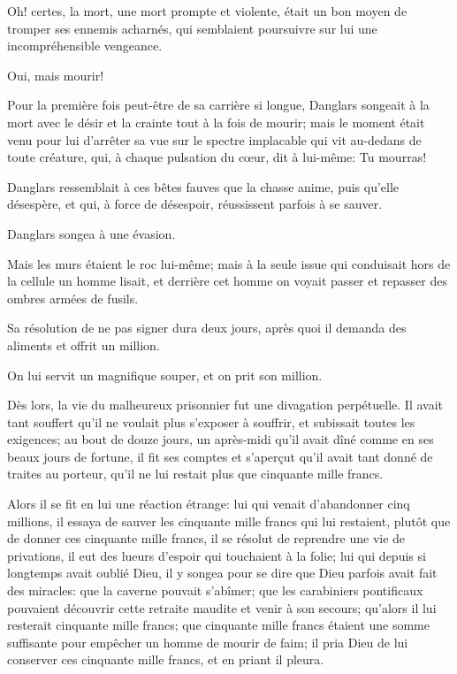 Oh! certes, la mort, une mort prompte et violente, était un bon moyen de tromper ses ennemis acharnés, qui semblaient poursuivre sur lui une incompréhensible vengeance. 

Oui, mais mourir! 

Pour la première fois peut-être de sa carrière si longue, Danglars songeait à la mort avec le désir et la crainte tout à la fois de mourir; mais le moment était venu pour lui d'arrêter sa vue sur le spectre implacable qui vit au-dedans de toute créature, qui, à chaque pulsation du cœur, dit à lui-même: Tu mourras! 

Danglars ressemblait à ces bêtes fauves que la chasse anime, puis qu'elle désespère, et qui, à force de désespoir, réussissent parfois à se sauver. 

Danglars songea à une évasion. 

Mais les murs étaient le roc lui-même; mais à la seule issue qui conduisait hors de la cellule un homme lisait, et derrière cet homme on voyait passer et repasser des ombres armées de fusils. 

Sa résolution de ne pas signer dura deux jours, après quoi il demanda des aliments et offrit un million. 

On lui servit un magnifique souper, et on prit son million. 

Dès lors, la vie du malheureux prisonnier fut une divagation perpétuelle. Il avait tant souffert qu'il ne voulait plus s'exposer à souffrir, et subissait toutes les exigences; au bout de douze jours, un après-midi qu'il avait dîné comme en ses beaux jours de fortune, il fit ses comptes et s'aperçut qu'il avait tant donné de traites au porteur, qu'il ne lui restait plus que cinquante mille francs. 

Alors il se fit en lui une réaction étrange: lui qui venait d'abandonner cinq millions, il essaya de sauver les cinquante mille francs qui lui restaient, plutôt que de donner ces cinquante mille francs, il se résolut de reprendre une vie de privations, il eut des lueurs d'espoir qui touchaient à la folie; lui qui depuis si longtemps avait oublié Dieu, il y songea pour se dire que Dieu parfois avait fait des miracles: que la caverne pouvait s'abîmer; que les carabiniers pontificaux pouvaient découvrir cette retraite maudite et venir à son secours; qu'alors il lui resterait cinquante mille francs; que cinquante mille francs étaient une somme suffisante pour empêcher un homme de mourir de faim; il pria Dieu de lui conserver ces cinquante mille francs, et en priant il pleura. 

